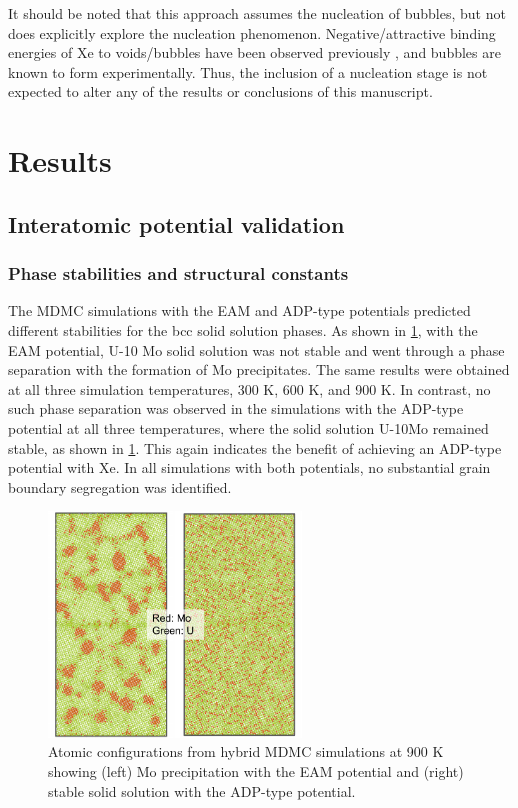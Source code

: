 \documentclass[review]{elsarticle}
\begin{document}
It should be noted that this approach assumes the nucleation of bubbles, but not does explicitly explore the nucleation phenomenon. Negative/attractive binding energies of Xe to voids/bubbles have been observed previously \cite{Beeler2020}, and bubbles are known to form experimentally. Thus, the inclusion of a nucleation stage is not expected to alter any of the results or conclusions of this manuscript. 

\section{Results}
\subsection{Interatomic potential validation}

\subsubsection{Phase stabilities and structural constants}

The MDMC simulations with the EAM and ADP-type potentials predicted different stabilities for the bcc solid solution phases. As shown in \cref{fig:Mo_precip}, with the EAM potential, U-10 Mo solid solution was not stable and went through a phase separation with the formation of Mo precipitates. The same results were obtained at all three simulation temperatures, 300 K, 600 K, and 900 K. In contrast, no such phase separation was observed in the simulations with the ADP-type potential at all three temperatures, where the solid solution U-10Mo remained stable, as shown in \cref{fig:Mo_precip}. This again indicates the benefit of achieving an ADP-type potential with Xe. In all simulations with both potentials, no substantial grain boundary segregation was identified. 

\begin{figure}[h!]
 \centering
 \includegraphics[width=0.6\textwidth]{Mo_precipitation} 
 \caption{Atomic configurations from hybrid MDMC simulations at 900 K showing (left) Mo precipitation with the EAM potential and (right) stable solid solution with the ADP-type potential. }
 \label{fig:Mo_precip}
\end{figure}
\end{document}
